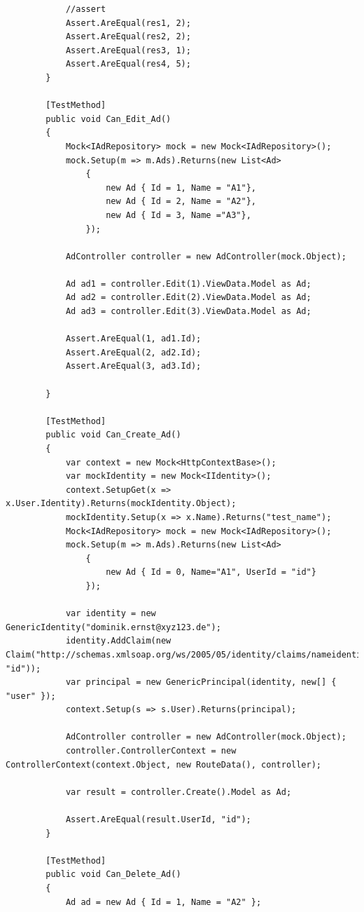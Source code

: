 \documentclass[14pt,a4paper]{extreport}
\begin{document}
\begin{lstlisting}
            //assert
            Assert.AreEqual(res1, 2);
            Assert.AreEqual(res2, 2);
            Assert.AreEqual(res3, 1);
            Assert.AreEqual(res4, 5);
        }

        [TestMethod]
        public void Can_Edit_Ad()
        {
            Mock<IAdRepository> mock = new Mock<IAdRepository>();
            mock.Setup(m => m.Ads).Returns(new List<Ad>
                {
                    new Ad { Id = 1, Name = "A1"},
                    new Ad { Id = 2, Name = "A2"},
                    new Ad { Id = 3, Name ="A3"},
                });

            AdController controller = new AdController(mock.Object);

            Ad ad1 = controller.Edit(1).ViewData.Model as Ad;
            Ad ad2 = controller.Edit(2).ViewData.Model as Ad;
            Ad ad3 = controller.Edit(3).ViewData.Model as Ad;

            Assert.AreEqual(1, ad1.Id);
            Assert.AreEqual(2, ad2.Id);
            Assert.AreEqual(3, ad3.Id);

        }

        [TestMethod]
        public void Can_Create_Ad()
        {
            var context = new Mock<HttpContextBase>();
            var mockIdentity = new Mock<IIdentity>();
            context.SetupGet(x => x.User.Identity).Returns(mockIdentity.Object);
            mockIdentity.Setup(x => x.Name).Returns("test_name");
            Mock<IAdRepository> mock = new Mock<IAdRepository>();
            mock.Setup(m => m.Ads).Returns(new List<Ad>
                {
                    new Ad { Id = 0, Name="A1", UserId = "id"}
                });

            var identity = new GenericIdentity("dominik.ernst@xyz123.de");
            identity.AddClaim(new Claim("http://schemas.xmlsoap.org/ws/2005/05/identity/claims/nameidentifier", "id"));
            var principal = new GenericPrincipal(identity, new[] { "user" });
            context.Setup(s => s.User).Returns(principal);

            AdController controller = new AdController(mock.Object);
            controller.ControllerContext = new ControllerContext(context.Object, new RouteData(), controller);

            var result = controller.Create().Model as Ad;
            
            Assert.AreEqual(result.UserId, "id");
        }

        [TestMethod]
        public void Can_Delete_Ad()
        {
            Ad ad = new Ad { Id = 1, Name = "A2" };


\end{lstlisting}
\end{document}
